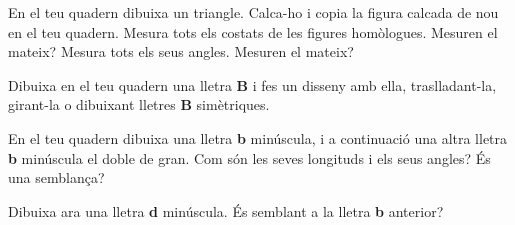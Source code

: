 \begin{mylist}
\exer  En el teu quadern dibuixa un triangle. Calca-ho i copia la figura calcada de nou en el teu quadern. Mesura tots els costats de les figures homòlogues. Mesuren el mateix? Mesura tots els seus angles. Mesuren el mateix?


\exer  Dibuixa en el teu quadern una lletra \textbf{B} i fes un disseny amb ella, traslladant-la, girant-la o dibuixant lletres \textbf{B} simètriques.


\exer  En el teu quadern dibuixa una lletra \textbf{b} minúscula, i a continuació una altra lletra \textbf{b} minúscula el doble de gran. Com són les seves longituds i els seus angles? És una semblança?


\exer  Dibuixa ara una lletra \textbf{d} minúscula. És semblant a la lletra \textbf{b} anterior?


\end{mylist}
